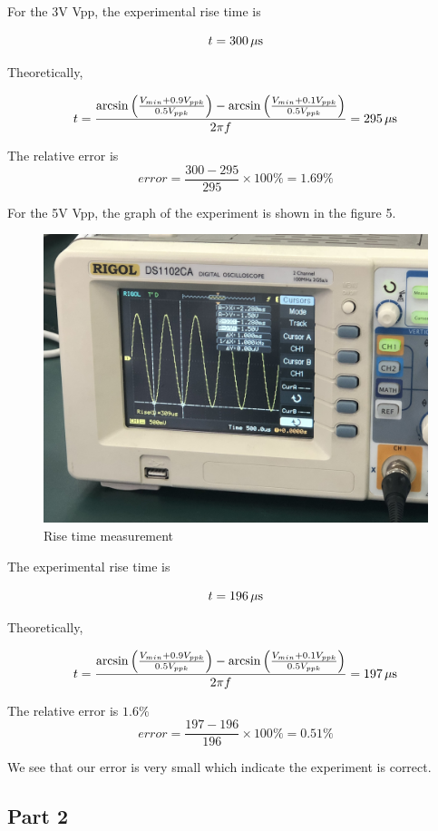 \documentclass{article}
\begin{document}
For the 3V Vpp, the experimental rise time is

$$t=300\,\rm \mu s$$

Theoretically,

$$t=\frac{\arcsin\left(\frac{V_{min}+0.9V_{ppk}}{0.5V_{ppk}}\right)-\arcsin\left(\frac{V_{min}+0.1V_{ppk}}{0.5V_{ppk}}\right)}{2\pi f}=295\,\rm \mu s$$

The relative error is 
$$error = \frac{300-295}{295}\times 100\% = 1.69\%$$

For the 5V Vpp, the graph of the experiment is shown in the figure 5.
  \begin{figure}[H]
  \centering
  \includegraphics[width=.6\textwidth]{Figure5.jpg}
  \caption{Rise time measurement}
  \label{img} 
\end{figure}
The experimental rise time is

$$t=196\,\rm \mu s$$

Theoretically,

$$t=\frac{\arcsin\left(\frac{V_{min}+0.9V_{ppk}}{0.5V_{ppk}}\right)-\arcsin\left(\frac{V_{min}+0.1V_{ppk}}{0.5V_{ppk}}\right)}{2\pi f}=197\,\rm \mu s$$

The relative error is $1.6\%$\\
$$error = \frac{197-196}{196}\times 100\% = 0.51\%$$

We see that our error is very small which indicate the experiment is correct.
\subsection{Part 2}
\end{document}
